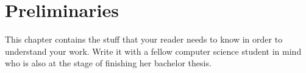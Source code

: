 \chapter{Preliminaries}\label{preliminaries}
This chapter contains the stuff that your reader needs to know in order to understand
your work.
Write it with a fellow computer science student in mind who is also at the stage of
finishing her bachelor thesis.
